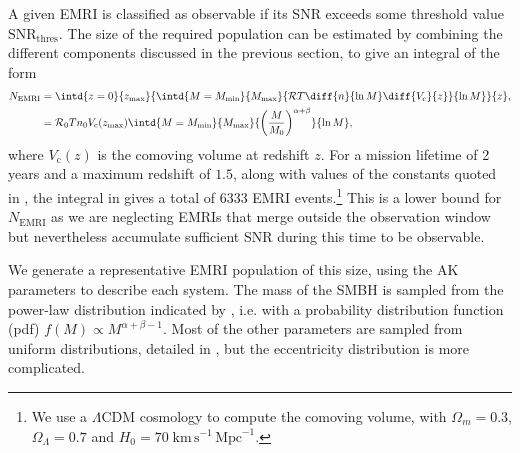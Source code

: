 A given EMRI is classified as observable if its SNR exceeds some threshold value $\mathrm{SNR}_\mathrm{thres}$. The size of the required population can be estimated by combining the different components discussed in the previous section, to give an integral of the form \citep{gair_probing_2009}
\begin{align}
\label{eq:EMRI-number}
N_\mathrm{EMRI} &= \intd{z=0}{z_\mathrm{max}}{ \intd{M=M_\mathrm{min}}{M_\mathrm{max}}{   \mathcal{R}T\diff{n}{\ln M} \diff{V_\mathrm{c}}{z}   }{\ln M}  }{z},\\
&= \mathcal{R}_0 T n_0 V_\mathrm{c}(z_\mathrm{max}) \intd{M=M_\mathrm{min}}{M_\mathrm{max}}{   \left(\frac{M}{M_0}\right)^{\alpha+\beta}   }{\ln M}, \label{eq:EMRI-num-Mdist}
\end{align}
where $V_\mathrm{c}(z)$ is the comoving volume at redshift $z$. For a mission lifetime of 2 years and a maximum redshift of $1.5$, along with values of the constants quoted in , the integral in  gives a total of $6333$ EMRI events.\footnote{We use a $\Lambda$CDM cosmology to compute the comoving volume, with $\Omega_m = 0.3$, $\Omega_\Lambda = 0.7$ and $H_0 = 70\;\mathrm{km}\,\mathrm{s}^{-1}\,\mathrm{Mpc}^{-1}$.} This is a lower bound for $N_\mathrm{EMRI}$ as we are neglecting EMRIs that merge outside the observation window but nevertheless accumulate sufficient SNR during this time to be observable.

We generate a representative EMRI population of this size, using the AK parameters to describe each system. The mass of the SMBH is sampled from the power-law distribution indicated by , i.e. with a probability distribution function (pdf) $f(M) \propto M^{\alpha+\beta-1}$. Most of the other parameters are sampled from uniform distributions, detailed in , but the eccentricity distribution is more complicated.

